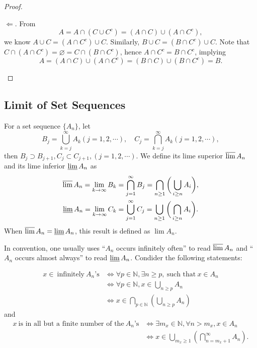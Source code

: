 \documentclass[11pt,singlecolumn, openany, citestyle=authoryear]{elegantbook}
\begin{document}
\begin{CJK}{UTF8}{gbsn}
\begin{proof}
\begin{enumerate}
            $\Longleftarrow$. From 
            $$
            A = A \cap(C \cup C^c) = (A\cap C) \cup (A\cap C^c),
            $$
            we know $A \cup C=(A \cap C^c) \cup C$. Similarly, $B \cup C=(B \cap C^c) \cup C$.
            Note that $C\cap (A \cap C^c) = \varnothing = C \cap(B\cap C^c)$, hence 
            $A \cap C^c = B \cap C^c$, implying 
            $$
            A = (A \cap C)\cup (A \cap C^c) = (B \cap C) \cup (B \cap C^c) = B.
            $$
        \end{enumerate}
    \end{proof}
    
    \subsection{Limit of Set Sequences}
    \begin{definition}
        For a set sequence $\{A_n\}$, let 
        $$
        B_j = \bigcup_{k=j}^\infty A_k (j=1,2,\cdots), \quad 
        C_j = \bigcap_{k=j}^\infty A_k (j=1,2,\cdots),
        $$
        then $B_j \supset B_{j+1}, C_j \subset C_{j+1}, (j=1,2,\cdots)$. We
        define its lime superior $\varlimsup A_n$ and its lime inferior
        $\varliminf A_n$ as 
        \begin{equation}
            \begin{gathered}
            \varlimsup A_n = 
            \lim_{k \to \infty} B_k = \bigcap_{j=1}^\infty B_j =
            \bigcap_{n\geq1} \bigg(\bigcup_{i \geq n} A_i\bigg),\\
            \varliminf A_n = 
            \lim_{k \to \infty} C_k = \bigcup_{j=1}^\infty C_j=
            \bigcup_{n\geq1} \bigg(\bigcap_{i \geq n} A_i\bigg).
            \end{gathered}
        \end{equation}
        When $\varlimsup A_n = \varliminf A_n$, this result is defined as $\lim A_n$.
    \end{definition}
    In convention, one usually uses ``$A_n$ occurs infinitely often'' to read $\varlimsup A_n$
    and ``$A_n$ occurs almost always'' to read $\varliminf A_n$.
    Condider the following statements:
    
    \noindent
    \begin{align*}
    x \in \ \text{infinitely} \ A_n\text{'s} & \iff \forall p \in \mathbb{N}, 
    \exists n \geq p, \ \text{such that}\ x \in A_n\\
    &\iff \forall p \in \mathbb{N}, x \in \bigcup_{n \geq p}A_n \\
    &\iff x \in \bigcap_{p \in \mathbb{N}} \left(\bigcup_{n \geq p}A_n\right)
    \end{align*}
    and
    \begin{align*}
    x \ \text{is in all but a finite number of the}\ A_n \text{'s} & \iff 
    \exists m_x \in \mathbb{N}, \forall n > m_x, x \in A_n\\
    & \iff x\in \bigcup_{m_x \geqslant 1}\left(\bigcap_{n = m_x+1}^{\infty}A_n\right).
    \end{align*}
    

\end{CJK}
\end{document}
